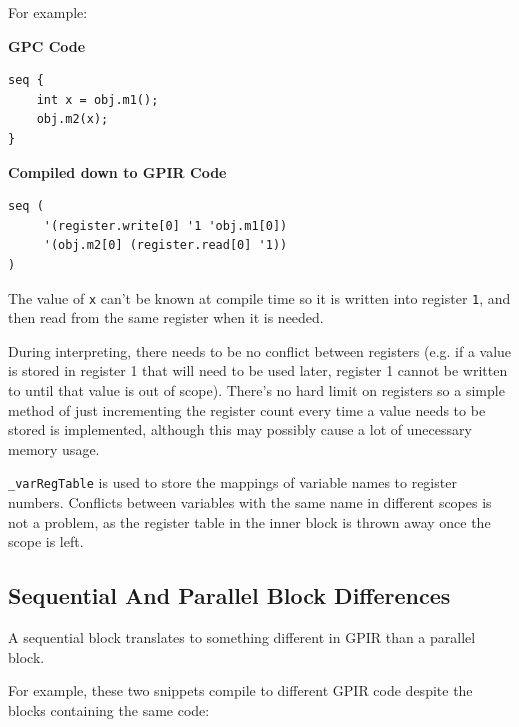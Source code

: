 For example:

\begin{center}{\textbf{GPC Code}}
\end{center}
\begin{lstlisting}[style=myGPC, frame=single]
seq {
    int x = obj.m1();
    obj.m2(x);
}
\end{lstlisting}

\begin{center}{\textbf{Compiled down to GPIR Code}}
\end{center}
\begin{lstlisting}[style=myGPIR, frame=single]
seq (
     '(register.write[0] '1 'obj.m1[0]) 
     '(obj.m2[0] (register.read[0] '1))
)
\end{lstlisting}

The value of \texttt{x} can't be known at compile time so it is written into register \texttt{1},
and then read from the same register when it is needed.

During interpreting, there needs to be no conflict between registers (e.g. if a value
is stored in register 1 that will need to be used later, register 1 cannot be written to
until that value is out of scope). There's no hard limit on registers so a simple
method of just incrementing the register count every time a value needs to be stored
is implemented, although this may possibly cause a lot of unecessary memory usage.

\texttt{\_varRegTable} is used to store the mappings of variable names to register numbers. 
Conflicts between variables with the same name in different scopes is not a problem,
as the register table in the inner block is thrown away once the scope is left.

\subsection{Sequential And Parallel Block Differences}
A sequential block translates to something different in GPIR than a parallel block.

For example, these two snippets compile to different GPIR code despite
the blocks containing the same code:\\


